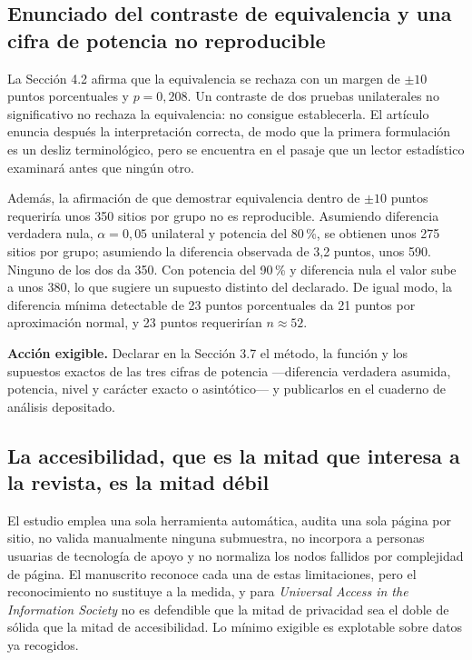 \documentclass[11pt,a4paper]{article}
\begin{document}
\subsection{Enunciado del contraste de equivalencia y una cifra de potencia no reproducible}

La Secci\'on 4.2 afirma que la equivalencia se rechaza con un margen de $\pm 10$ puntos porcentuales y $p = 0{,}208$. Un contraste de dos pruebas unilaterales no significativo no rechaza la equivalencia: no consigue establecerla. El art\'iculo enuncia despu\'es la interpretaci\'on correcta, de modo que la primera formulaci\'on es un desliz terminol\'ogico, pero se encuentra en el pasaje que un lector estad\'istico examinar\'a antes que ning\'un otro.

Adem\'as, la afirmaci\'on de que demostrar equivalencia dentro de $\pm 10$ puntos requerir\'ia unos 350 sitios por grupo no es reproducible. Asumiendo diferencia verdadera nula, $\alpha = 0{,}05$ unilateral y potencia del 80\,\%, se obtienen unos 275 sitios por grupo; asumiendo la diferencia observada de 3,2 puntos, unos 590. Ninguno de los dos da 350. Con potencia del 90\,\% y diferencia nula el valor sube a unos 380, lo que sugiere un supuesto distinto del declarado. De igual modo, la diferencia m\'inima detectable de 23 puntos porcentuales da 21 puntos por aproximaci\'on normal, y 23 puntos requerir\'ian $n \approx 52$.

\textbf{Acci\'on exigible.} Declarar en la Secci\'on 3.7 el m\'etodo, la funci\'on y los supuestos exactos de las tres cifras de potencia ---diferencia verdadera asumida, potencia, nivel y car\'acter exacto o asint\'otico--- y publicarlos en el cuaderno de an\'alisis depositado.

\subsection{La accesibilidad, que es la mitad que interesa a la revista, es la mitad d\'ebil}

El estudio emplea una sola herramienta autom\'atica, audita una sola p\'agina por sitio, no valida manualmente ninguna submuestra, no incorpora a personas usuarias de tecnolog\'ia de apoyo y no normaliza los nodos fallidos por complejidad de p\'agina. El manuscrito reconoce cada una de estas limitaciones, pero el reconocimiento no sustituye a la medida, y para \emph{Universal Access in the Information Society} no es defendible que la mitad de privacidad sea el doble de s\'olida que la mitad de accesibilidad. Lo m\'inimo exigible es explotable sobre datos ya recogidos.
\end{document}
